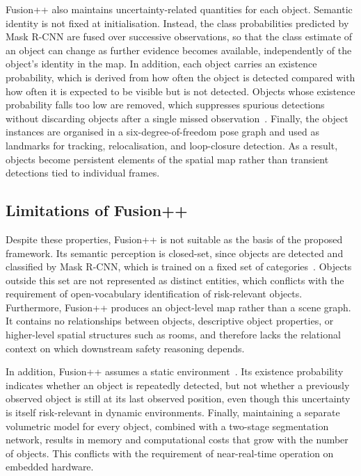 {{{Fusion++ also maintains uncertainty-related quantities for each object. Semantic identity is not fixed at initialisation. Instead, the class probabilities predicted by Mask R-CNN are fused over successive observations, so that the class estimate of an object can change as further evidence becomes available, independently of the object's identity in the map. In addition, each object carries an existence probability, which is derived from how often the object is detected compared with how often it is expected to be visible but is not detected. Objects whose existence probability falls too low are removed, which suppresses spurious detections without discarding objects after a single missed observation~\cite{mccormac2018fusion}. Finally, the object instances are organised in a six-degree-of-freedom pose graph and used as landmarks for tracking, relocalisation, and loop-closure detection. As a result, objects become persistent elements of the spatial map rather than transient detections tied to individual frames.
}
\subsection{Limitations of Fusion++}
\label{subsec:fusionpp_limitations}
{\small
Despite these properties, Fusion++ is not suitable as the basis of the proposed framework. Its semantic perception is closed-set, since objects are detected and classified by Mask R-CNN, which is trained on a fixed set of categories~\cite{mccormac2018fusion}. Objects outside this set are not represented as distinct entities, which conflicts with the requirement of open-vocabulary identification of risk-relevant objects. Furthermore, Fusion++ produces an object-level map rather than a scene graph. It contains no relationships between objects, descriptive object properties, or higher-level spatial structures such as rooms, and therefore lacks the relational context on which downstream safety reasoning depends.

In addition, Fusion++ assumes a static environment~\cite{mccormac2018fusion}. Its existence probability indicates whether an object is repeatedly detected, but not whether a previously observed object is still at its last observed position, even though this uncertainty is itself risk-relevant in dynamic environments. Finally, maintaining a separate volumetric model for every object, combined with a two-stage segmentation network, results in memory and computational costs that grow with the number of objects. This conflicts with the requirement of near-real-time operation on embedded hardware.
}
}}
